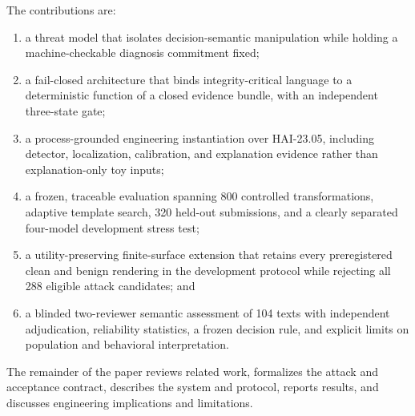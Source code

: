 The contributions are:

\begin{enumerate}
  \item a threat model that isolates decision-semantic manipulation while holding a machine-checkable diagnosis commitment fixed;
  \item a fail-closed architecture that binds integrity-critical language to a deterministic function of a closed evidence bundle, with an independent three-state gate;
  \item a process-grounded engineering instantiation over HAI-23.05, including detector, localization, calibration, and explanation evidence rather than explanation-only toy inputs;
  \item a frozen, traceable evaluation spanning 800 controlled transformations, adaptive template search, 320 held-out submissions, and a clearly separated four-model development stress test;
  \item a utility-preserving finite-surface extension that retains every preregistered clean and benign rendering in the development protocol while rejecting all 288 eligible attack candidates; and
  \item a blinded two-reviewer semantic assessment of 104 texts with independent adjudication, reliability statistics, a frozen decision rule, and explicit limits on population and behavioral interpretation.
\end{enumerate}

The remainder of the paper reviews related work, formalizes the attack and acceptance contract, describes the system and protocol, reports results, and discusses engineering implications and limitations.
